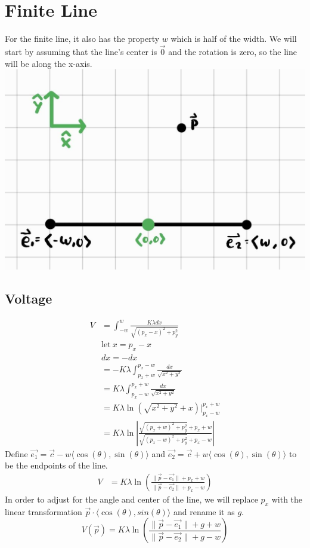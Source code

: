 \documentclass{article}
\begin{document}
\section{Finite Line}
For the finite line, it also has the property $w$ which is half of the width. We will start by assuming that the line's center is $\vec{0}$ and the rotation is zero, so the line will be along the x-axis.\\
\includegraphics[scale=0.25]{finite_line_setup.jpg}
\subsection{Voltage}
\begin{align*}
    V &= \int_{-w}^w \frac{K \lambda dx}{\sqrt{(p_x-x)^2+p_y^2}} \\
    &\text{let}\ x=p_x-x \\
    &dx = -dx \\
    &= -K\lambda\int_{p_x+w}^{p_x-w} \frac{dx}{\sqrt{x^2+y^2}} \\
    &= K\lambda\int_{p_x-w}^{p_x+w} \frac{dx}{\sqrt{x^2+y^2}} \\
    &= K\lambda \ln{\left(\sqrt{x^2+y^2}+x\right)} |_{p_x-w}^{p_x+w} \\
    &= K\lambda \ln{\left|\frac{\sqrt{(p_x+w)^2+p_y^2}+p_x+w}{\sqrt{(p_x-w)^2+p_y^2}+p_x-w}\right|}
\end{align*}
Define $\vec{e_1} = \vec{c} - w\langle\cos(\theta),\sin(\theta)\rangle$ and $\vec{e_2} = \vec{c} + w\langle\cos(\theta),\sin(\theta)\rangle$ to be the endpoints of the line.
\begin{align*}
    V &= K\lambda \ln \left(\frac{\lVert \vec{p}-\vec{e_1}\rVert+p_x+w}{\lVert \vec{p}-\vec{e_2}\rVert+p_x-w}\right)
\end{align*}
In order to adjust for the angle and center of the line, we will replace $p_x$ with the linear transformation $\vec{p} \cdot \langle\cos(\theta),sin(\theta)\rangle$ and rename it as $g$.
\begin{equation}
    V(\vec{p}) = K\lambda \ln \left( \frac{\lVert\vec{p}-\vec{e_1}\rVert+g+w}{\lVert\vec{p}-\vec{e_2}\rVert+g-w} \right)
\end{equation}
\end{document}
